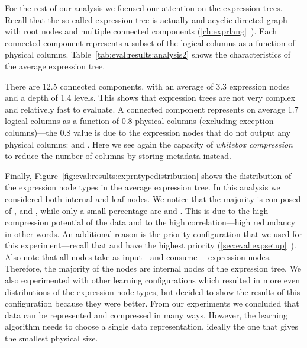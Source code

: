 For the rest of our analysis we focused our attention on the expression trees. Recall that the so called expression tree is actually and acyclic directed graph with root nodes and multiple connected components (\ref{ch:exprlang}~). Each connected component represents a subset of the logical columns as a function of physical columns. Table~\ref{tab:eval:results:analysis2} shows the characteristics of the average expression tree.



There are 12.5 connected components, with an average of 3.3 expression nodes and a depth of 1.4 levels. This shows that expression trees are not very complex and relatively fast to evaluate. A connected component represents on average 1.7 logical columns as a function of 0.8 physical columns (excluding exception columns)---the 0.8 value is due to the expression nodes that do not output any physical columns:  and . Here we see again the capacity of \textit{whitebox compression} to reduce the number of columns by storing metadata instead.


Finally, Figure~\ref{fig:eval:results:exprntypedistribution} shows the distribution of the expression node types in the average expression tree. In this analysis we considered both internal and leaf nodes. We notice that the majority is composed of ,  and , while only a small percentage are  and . This is due to the high  compression potential of the data and to the high correlation---high redundancy in other words. An additional reason is the priority configuration that we used for this experiment---recall that  and  have the highest priority (\ref{sec:eval:expsetup}~). Also note that all  nodes take as input---and consume--- expression nodes. Therefore, the majority of the  nodes are internal nodes of the expression tree. We also experimented with other learning configurations which resulted in more even distributions of the expression node types, but decided to show the results of this configuration because they were better. From our experiments we concluded that data can be represented and compressed in many ways. However, the learning algorithm needs to choose a single data representation, ideally the one that gives the smallest physical size.

